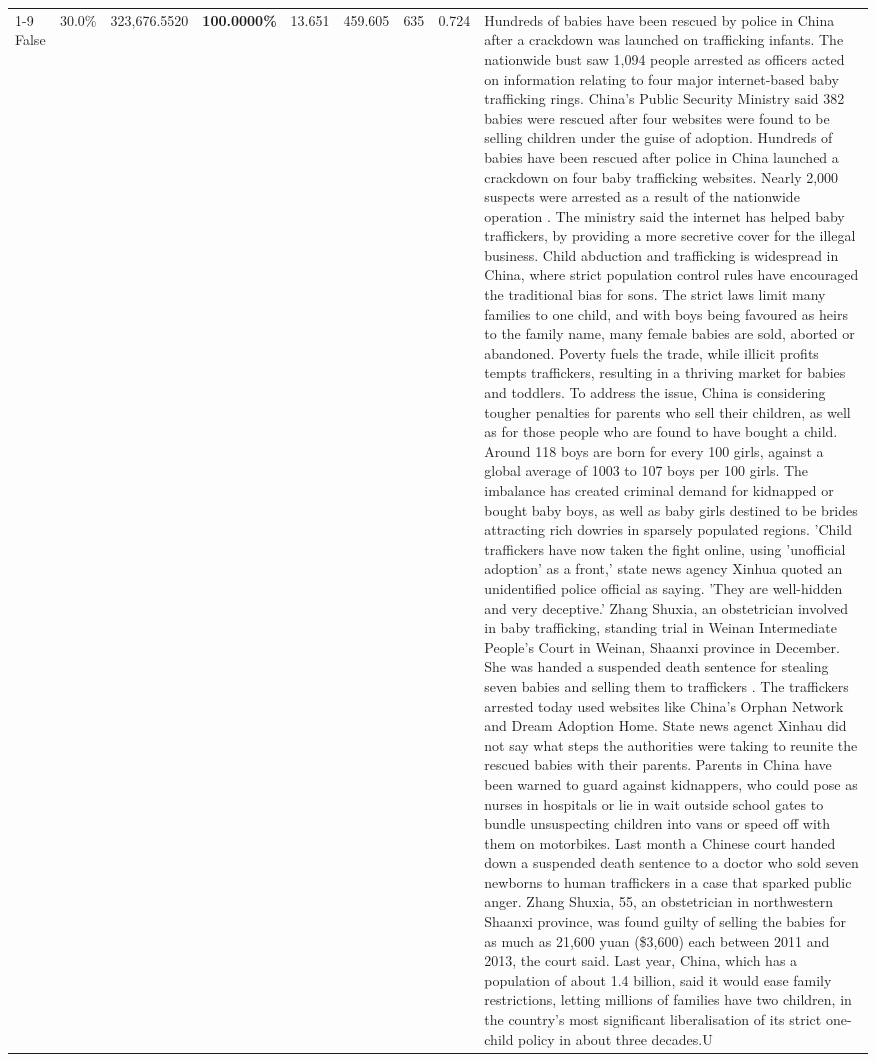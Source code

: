 \begin{table}[H]
\begin{tabular}{lllrlllll}
\cline{1-9}
False & 30.0\% & 323,676.5520 & \bfseries \color{red} 100.0000\% & 13.651 & 459.605 & 635 & 0.724 & Hundreds of babies have been rescued by police in China after a crackdown was launched on trafficking infants. The nationwide bust saw 1,094 people arrested as officers acted on information relating to four major internet-based baby trafficking rings. China's Public Security Ministry said 382 babies were rescued after four websites were found to be selling children under the guise of adoption. Hundreds of babies have been rescued after police in China launched a crackdown on four baby trafficking websites. Nearly 2,000 suspects were arrested as a result of the nationwide operation . The ministry said the internet has helped baby traffickers, by providing a more secretive cover for the illegal business. Child abduction and trafficking is widespread in China, where strict population control rules have encouraged the traditional bias for sons. The strict laws limit many families to one child, and with boys being favoured as heirs to the family name, many female babies are sold, aborted or abandoned. Poverty fuels the trade, while illicit profits tempts traffickers, resulting in a thriving market for babies and toddlers. To address the issue, China is considering tougher penalties for parents who sell their children, as well as for those people who are found to have bought a child. Around 118 boys are born for every 100 girls, against a global average of 1003 to 107 boys per 100 girls. The imbalance has created criminal demand for kidnapped or bought baby boys, as well as baby girls destined to be brides attracting rich dowries in sparsely populated regions. 'Child traffickers have now taken the fight online, using 'unofficial adoption' as a front,' state news agency Xinhua quoted an unidentified police official as saying. 'They are well-hidden and very deceptive.' Zhang Shuxia, an obstetrician involved in baby trafficking, standing trial in Weinan Intermediate People's Court in Weinan, Shaanxi province in December. She was handed a suspended death sentence for stealing seven babies and selling them to traffickers . The traffickers arrested today used websites like China's Orphan Network and Dream Adoption Home. State news agenct Xinhau did not say what steps the authorities were taking to reunite the rescued babies with their parents. Parents in China have been warned to guard against kidnappers, who could pose as nurses in hospitals or lie in wait outside school gates to bundle unsuspecting children into vans or speed off with them on motorbikes. Last month a Chinese court handed down a suspended death sentence to a doctor who sold seven newborns to human traffickers in a case that sparked public anger. Zhang Shuxia, 55, an obstetrician in northwestern Shaanxi province, was found guilty of selling the babies for as much as 21,600 yuan (\$3,600) each between 2011 and 2013, the court said. Last year, China, which has a population of about 1.4 billion, said it would ease family restrictions, letting millions of families have two children, in the country's most significant liberalisation of its strict one-child policy in about three decades.U \\

\end{tabular}
\end{table}
